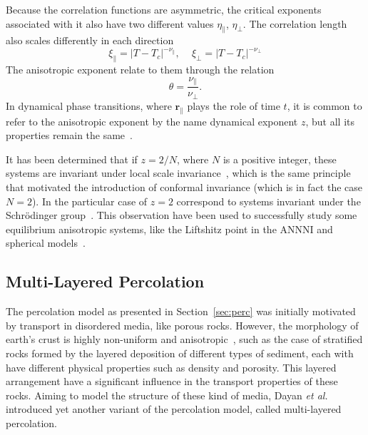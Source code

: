 Because the correlation functions are asymmetric, the critical exponents
associated with it also have two different values $\eta_\parallel$,
$\eta_\perp$. The correlation length also scales differently in each direction
\begin{equation}
    \xi_{\parallel}=
    \left|T-T_{c}\right|^{-\nu_{\parallel}},
    \,\,\,\,\,\,\,
    \xi_{\perp}=\left|T-T_{c}\right|^{-\nu_{\perp}}
\end{equation}
The anisotropic exponent relate to them through the relation
\begin{equation}
    \theta = \frac{\nu_\parallel}{\nu_\perp}.
\end{equation}
In dynamical phase transitions, where $\mathbf{r}_\parallel$ plays the role of
time $t$, it is common to refer to the anisotropic exponent by the name
dynamical exponent $z$, but all its properties remain the
same~\cite{Henkel1994}.

It has been determined that if $z = 2/N$, where $N$ is a positive integer,
these systems are invariant under local scale invariance~\cite{Henkel2003},
which is the same principle that motivated the introduction of conformal
invariance (which is in fact the case $N=2$). In the particular case of $z=2$
correspond to systems invariant under the Schr\"odinger
group~\cite{Henkel1992}. This observation have been used to successfully study
some equilibrium anisotropic systems, like the Liftshitz point in the ANNNI and
spherical models~\cite{Henkel2010}.


\subsection{Multi-Layered Percolation}
\label{sec:mlp}

The percolation model as presented in Section~\ref{sec:perc} was initially
motivated by transport in disordered media, like porous rocks. However, the
morphology of earth's crust is highly non-uniform and
anisotropic~\cite{Englman1986}, such as the case of stratified rocks formed by
the layered deposition of different types of sediment, each with have different
physical properties such as density and porosity. This layered arrangement have
a significant influence in the transport properties of these rocks. Aiming to
model the structure of these kind of media, Dayan \textit{et
al.}~\cite{Dayan1991} introduced yet another variant of the percolation
model, called multi-layered percolation. 

